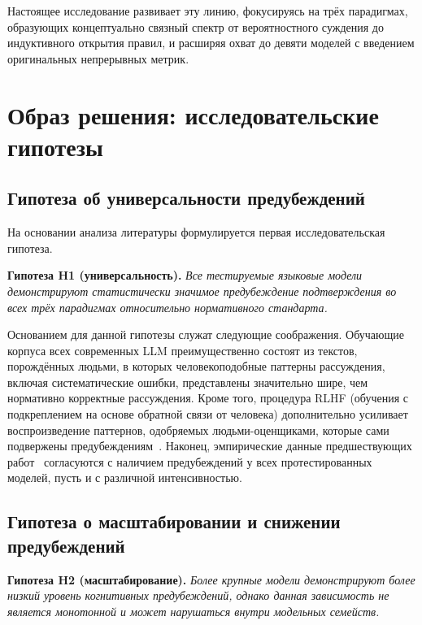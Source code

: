 Настоящее исследование развивает эту линию, фокусируясь на трёх парадигмах, образующих концептуально связный спектр от вероятностного суждения до индуктивного открытия правил, и расширяя охват до девяти моделей с введением оригинальных непрерывных метрик.

\section{Образ решения: исследовательские гипотезы}

\subsection{Гипотеза об универсальности предубеждений}

На основании анализа литературы формулируется первая исследовательская гипотеза.

\textbf{Гипотеза H1 (универсальность).} \textit{Все тестируемые языковые модели демонстрируют статистически значимое предубеждение подтверждения во всех трёх парадигмах относительно нормативного стандарта.}

Основанием для данной гипотезы служат следующие соображения. Обучающие корпуса всех современных LLM преимущественно состоят из текстов, порождённых людьми, в которых человекоподобные паттерны рассуждения, включая систематические ошибки, представлены значительно шире, чем нормативно корректные рассуждения. Кроме того, процедура RLHF (обучения с подкреплением на основе обратной связи от человека) дополнительно усиливает воспроизведение паттернов, одобряемых людьми-оценщиками, которые сами подвержены предубеждениям~\cite{batista2026rational}. Наконец, эмпирические данные предшествующих работ~\cite{binz2023using, macmillan2024irrationality, banatt2024wilt} согласуются с наличием предубеждений у всех протестированных моделей, пусть и с различной интенсивностью.

\subsection{Гипотеза о масштабировании и снижении предубеждений}

\textbf{Гипотеза H2 (масштабирование).} \textit{Более крупные модели демонстрируют более низкий уровень когнитивных предубеждений, однако данная зависимость не является монотонной и может нарушаться внутри модельных семейств.}

